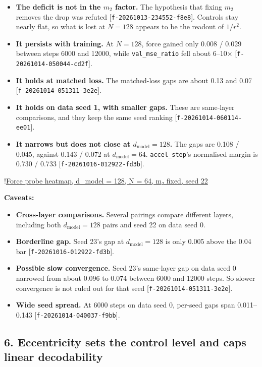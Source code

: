 \documentclass{article}
\begin{document}
\begin{itemize}
\item \textbf{The deficit is not in the $m_2$ factor.} The hypothesis that fixing $m_2$ removes the drop was refuted [\texttt{f-20261013-234552-f8e8}]. Controls stay nearly flat, so what is lost at $N = 128$ appears to be the readout of $1/r^2$.
\item \textbf{It persists with training.} At $N = 128$, force gained only 0.008 / 0.029 between steps 6000 and 12000, while \texttt{val\_mse\_ratio} fell about 6–10× [\texttt{f-20261014-050044-cd2f}].
\item \textbf{It holds at matched loss.} The matched-loss gaps are about 0.13 and 0.07 [\texttt{f-20261014-051311-3e2e}].
\item \textbf{It holds on data seed 1, with smaller gaps.} These are same-layer comparisons, and they keep the same seed ranking [\texttt{f-20261014-060114-ee01}].
\item \textbf{It narrows but does not close at $d_{\text{model}} = 128$.} The gaps are 0.108 / 0.045, against 0.143 / 0.072 at $d_{\text{model}} = 64$. \texttt{accel\_step}'s normalised margin is 0.730 / 0.733 [\texttt{f-20261016-012922-fd3b}].
\end{itemize}

!\href{figure:heatmap/run-20261016-002356-cbfe/force}{Force probe heatmap, d\_model = 128, N = 64, m₂ fixed, seed 22}

\textbf{Caveats:}

\begin{itemize}
\item \textbf{Cross-layer comparisons.} Several pairings compare different layers, including both $d_{\text{model}} = 128$ pairs and seed 22 on data seed 0.
\item \textbf{Borderline gap.} Seed 23's gap at $d_{\text{model}} = 128$ is only 0.005 above the 0.04 bar [\texttt{f-20261016-012922-fd3b}].
\item \textbf{Possible slow convergence.} Seed 23's same-layer gap on data seed 0 narrowed from about 0.096 to 0.074 between 6000 and 12000 steps. So slower convergence is not ruled out for that seed [\texttt{f-20261014-051311-3e2e}].
\item \textbf{Wide seed spread.} At 6000 steps on data seed 0, per-seed gaps span 0.011–0.143 [\texttt{f-20261014-040037-f9bb}].
\end{itemize}

\subsection{6. Eccentricity sets the control level and caps linear decodability}
\end{document}
